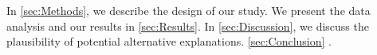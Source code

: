 \blindmathtrue

\blindtext

In \autoref{sec:Methods}, we describe the design of our study. We present the data analysis and our results in \autoref{sec:Results}. In \autoref{sec:Discussion}, we discuss the plausibility of potential alternative explanations. \autoref{sec:Conclusion} .
